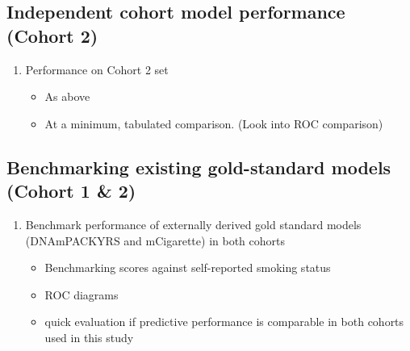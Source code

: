 \documentclass{article}
\begin{document}
\subsection{Independent cohort model performance (Cohort 2)} \label{sec:cohort2-performance}
\begin{enumerate}
    \item Performance on Cohort 2 set
          \begin{itemize}
              \item As above
              \item At a minimum, tabulated comparison. (Look into ROC comparison)
          \end{itemize}
\end{enumerate}

\subsection{Benchmarking existing gold-standard models (Cohort 1 \& 2)} \label{sec:prior-benchmarks}
\begin{enumerate}
    \item Benchmark performance of externally derived gold standard models (DNAmPACKYRS and mCigarette) in both cohorts
          \begin{itemize}
              \item Benchmarking scores against self-reported smoking status
              \item ROC diagrams
              \item quick evaluation if predictive performance is comparable in both cohorts used in this study
          \end{itemize}
\end{enumerate}
\end{document}
